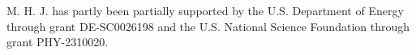 M. H. J. has partly been partially supported by the U.S. Department of Energy through grant DE-SC0026198 and the U.S. National Science Foundation through grant PHY-2310020.  
	
%


	
	
\newpage
\appendix
\renewcommand*{\thesection}{\Alph{section}}
	
		
